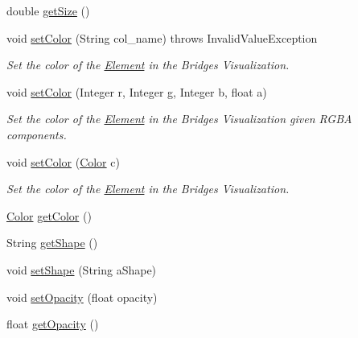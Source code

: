 \begin{DoxyCompactItemize}
\item 
double \mbox{\hyperlink{classbridges_1_1base_1_1_element_visualizer_a0b7673bf724e3df1f94df50ad95ca5b1}{get\+Size}} ()
\item 
void \mbox{\hyperlink{classbridges_1_1base_1_1_element_visualizer_ad7ff2a772741301c08943a58ffccca38}{set\+Color}} (String col\+\_\+name)  throws Invalid\+Value\+Exception 
\begin{DoxyCompactList}\small\item\em Set the color of the \mbox{\hyperlink{classbridges_1_1base_1_1_element}{Element}} in the Bridges Visualization. \end{DoxyCompactList}\item 
void \mbox{\hyperlink{classbridges_1_1base_1_1_element_visualizer_a84fad1c8abe43b20c68c1800d7630918}{set\+Color}} (Integer r, Integer g, Integer b, float a)
\begin{DoxyCompactList}\small\item\em Set the color of the \mbox{\hyperlink{classbridges_1_1base_1_1_element}{Element}} in the Bridges Visualization given R\+G\+BA components. \end{DoxyCompactList}\item 
void \mbox{\hyperlink{classbridges_1_1base_1_1_element_visualizer_a33172ab908f3b6f9740727b0bfe91565}{set\+Color}} (\mbox{\hyperlink{classbridges_1_1base_1_1_color}{Color}} c)
\begin{DoxyCompactList}\small\item\em Set the color of the \mbox{\hyperlink{classbridges_1_1base_1_1_element}{Element}} in the Bridges Visualization. \end{DoxyCompactList}\item 
\mbox{\hyperlink{classbridges_1_1base_1_1_color}{Color}} \mbox{\hyperlink{classbridges_1_1base_1_1_element_visualizer_a3bf821b9bfa02746882bac934ce4fb8e}{get\+Color}} ()
\item 
String \mbox{\hyperlink{classbridges_1_1base_1_1_element_visualizer_a8ef0825745e49f32b57e4bf6c891b57e}{get\+Shape}} ()
\item 
void \mbox{\hyperlink{classbridges_1_1base_1_1_element_visualizer_ac3bad991904c8ad23e5233b341381d93}{set\+Shape}} (String a\+Shape)
\item 
void \mbox{\hyperlink{classbridges_1_1base_1_1_element_visualizer_a932f62eb1bd0c92da265a7f903dd0790}{set\+Opacity}} (float opacity)
\item 
float \mbox{\hyperlink{classbridges_1_1base_1_1_element_visualizer_ab86ff39f17f8d1766670b18be88b5492}{get\+Opacity}} ()

\end{DoxyCompactItemize}
